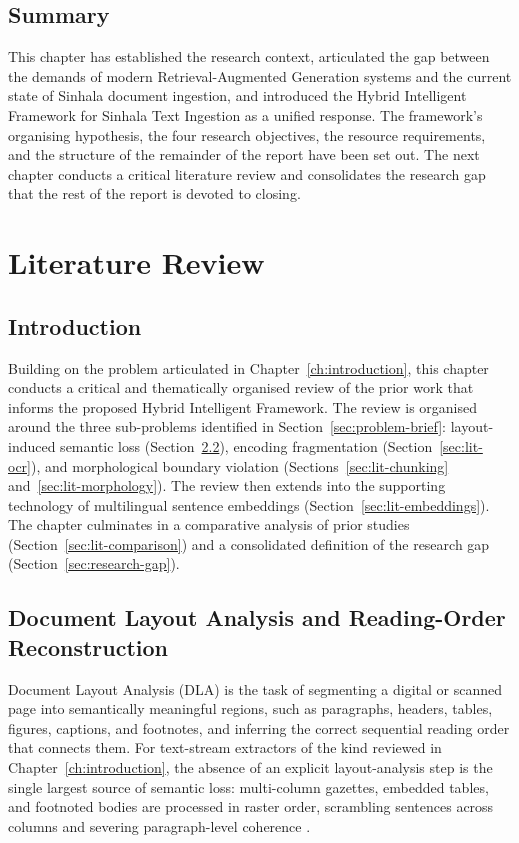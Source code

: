 \documentclass[12pt,a4paper,oneside]{report}
\begin{document}
\section{Summary}
\label{sec:ch1-summary}
This chapter has established the research context, articulated the gap between the demands of modern Retrieval-Augmented Generation systems and the current state of Sinhala document ingestion, and introduced the Hybrid Intelligent Framework for Sinhala Text Ingestion as a unified response. The framework's organising hypothesis, the four research objectives, the resource requirements, and the structure of the remainder of the report have been set out. The next chapter conducts a critical literature review and consolidates the research gap that the rest of the report is devoted to closing.

\chapter{Literature Review}
\label{ch:literature}

\section{Introduction}
Building on the problem articulated in Chapter~\ref{ch:introduction}, this chapter conducts a critical and thematically organised review of the prior work that informs the proposed Hybrid Intelligent Framework. The review is organised around the three sub-problems identified in Section~\ref{sec:problem-brief}: layout-induced semantic loss (Section~\ref{sec:lit-dla}), encoding fragmentation (Section~\ref{sec:lit-ocr}), and morphological boundary violation (Sections~\ref{sec:lit-chunking} and~\ref{sec:lit-morphology}). The review then extends into the supporting technology of multilingual sentence embeddings (Section~\ref{sec:lit-embeddings}). The chapter culminates in a comparative analysis of prior studies (Section~\ref{sec:lit-comparison}) and a consolidated definition of the research gap (Section~\ref{sec:research-gap}).

\section{Document Layout Analysis and Reading-Order Reconstruction}
\label{sec:lit-dla}

Document Layout Analysis (DLA) is the task of segmenting a digital or scanned page into semantically meaningful regions, such as paragraphs, headers, tables, figures, captions, and footnotes, and inferring the correct sequential reading order that connects them. For text-stream extractors of the kind reviewed in Chapter~\ref{ch:introduction}, the absence of an explicit layout-analysis step is the single largest source of semantic loss: multi-column gazettes, embedded tables, and footnoted bodies are processed in raster order, scrambling sentences across columns and severing paragraph-level coherence \cite{unstract2024pdfhell}.
\end{document}

